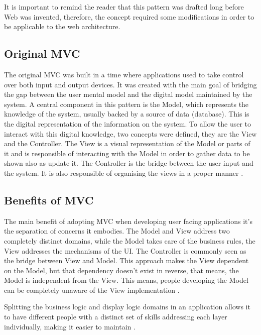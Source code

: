 It is important to remind the reader that this pattern was drafted long before Web was invented, therefore, the concept required some modifications in order to be applicable to the web architecture.

\subsection{Original MVC}

The original MVC was built in a time where applications used to take control over both input and output devices. It was created with the main goal of bridging the gap between the user mental model and the digital model maintained by the system. A central component in this pattern is the Model, which represents the knowledge of the system, usually backed by a source of data (database). This is the digital representation of the information on the system. To allow the user to interact with this digital knowledge, two concepts were defined, they are the View and the Controller. The View is a visual representation of the Model or parts of it and is responsible of interacting with the Model in order to gather data to be shown also as update it. The Controller is the bridge between the user input and the system. It is also responsible of organising the views in a proper manner \cite{Reenskaug1979THING-MODEL-VIEW-EDITORPlanningsystem}.


\subsection{Benefits of MVC}

The main benefit of adopting MVC when developing user facing applications it’s the separation of concerns it embodies. The Model and View address two completely distinct domains, while the Model takes care of the business rules, the View addresses the mechanisms of the UI. The Controller is commonly seen as the bridge between View and Model. This approach makes the View dependent on the Model, but that dependency doesn’t exist in reverse, that means, the Model is independent from the View. This means, people developing the Model can be completely unaware of the View implementation \cite{Parr2008TheSeparation, Parr2004EnforcingEngines, Fowler2003PatternsArchitecture}.

Splitting the business logic and display logic domains in an application allows it to have different people with a distinct set of skills addressing each layer individually, making it easier to maintain \cite{Parr2008TheSeparation}.


